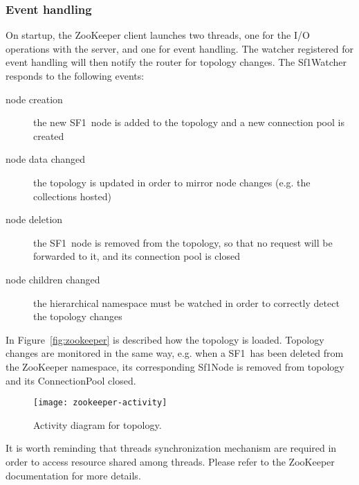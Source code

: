 \documentclass[a4paper,10pt]{article}
\makeatletter
\newcommand{\sfr}{\textsf{SF1}}
\newcommand{\code}[1]{\textsf{#1}}
\newcommand\mynobreakpar{\par\nobreak\@afterheading}
\makeatother
\begin{document}
\subsubsection*{Event handling}

On startup, the ZooKeeper client launches two threads, one for the I/O 
operations with the server, and one for event handling.
The watcher registered for event handling will then notify the router for 
topology changes. The \code{Sf1Watcher} responds to the following events:
\mynobreakpar
\begin{description}
 \item[node creation] the new \sfr\ node is added to the topology and a new 
                      connection pool is created
 \item[node data changed] the topology is updated in order to mirror node 
                          changes (e.g. the collections hosted)
 \item[node deletion] the \sfr\ node is removed from the topology, so that
                      no request will be forwarded to it, and its connection
                      pool is closed
 \item[node children changed] the hierarchical namespace must be watched in 
                              order to correctly detect the topology changes
\end{description}
In Figure~\vref{fig:zookeeper} is described how the topology is loaded.
Topology changes are monitored in the same way, e.g. when a \sfr\ has been
deleted from the ZooKeeper namespace, its corresponding \code{Sf1Node} is 
removed from topology and its \code{ConnectionPool} closed.

\begin{figure}
 \centering
 \texttt{[image: zookeeper-activity]}
 \caption{Activity diagram for topology.}
 \label{fig:zookeeper}
\end{figure}

It is worth reminding that threads synchronization mechanism are required 
in order to access resource shared among threads.
Please refer to the ZooKeeper documentation for more details.
\end{document}
